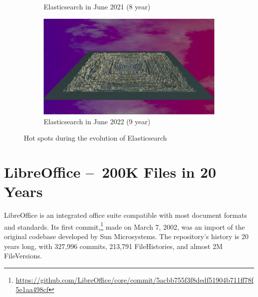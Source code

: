 \begin{figure}[ht]
\begin{subfigure}{0.48\textwidth}
        \caption{Elasticsearch in June 2021 (8 year)} 
        \label{fig:Elastic_V5_S5}
    \end{subfigure}\hspace*{\fill}
    \begin{subfigure}{0.48\textwidth}
        \includegraphics[width=\linewidth]{Elasticsearch/Animation009.png}
        \caption{Elasticsearch in June 2022 (9 year)} 
        \label{fig:Elastic_V5_S6}
    \end{subfigure}
    
    \caption{Hot spots during the evolution of Elasticsearch} 
    \label{fig:Elastic_V5}
\end{figure}


\clearpage
\section{LibreOffice – 200K Files in 20 Years}
LibreOffice is an integrated office suite compatible with most document formats and standards. Its first commit,\footnote{\url{https://github.com/LibreOffice/core/commit/5acbb755f3f8dedf51904b711ff78f5e1aa498cf}} made on March 7, 2002, was an import of the original codebase developed by Sun Microsystems. The repository's history is 20 years long, with 327,996 commits, 213,791 FileHistories, and almost 2M FileVersions. 

